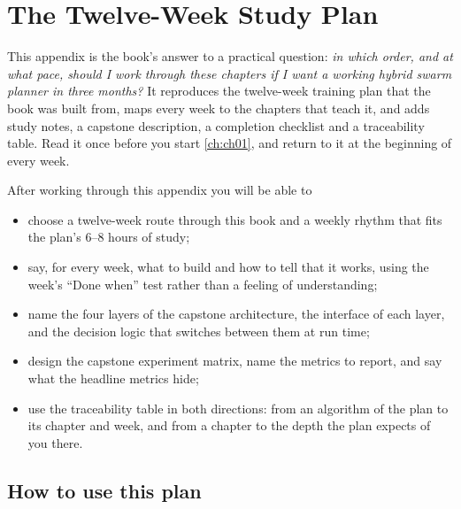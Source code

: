 \chapter{The Twelve-Week Study Plan}
\label{ch:appA}

This appendix is the book's answer to a practical question: \emph{in which order, and at
what pace, should I work through these chapters if I want a working hybrid swarm planner in
three months?} It reproduces the twelve-week training plan that the book was built from,
maps every week to the chapters that teach it, and adds study notes, a capstone
description, a completion checklist and a traceability table. Read it once before you start
\cref{ch:ch01}, and return to it at the beginning of every week.

\begin{objectives}
After working through this appendix you will be able to
\begin{itemize}
  \item choose a twelve-week route through this book and a weekly rhythm that fits the
    plan's 6--8 hours of study;
  \item say, for every week, what to build and how to tell that it works, using the week's
    ``Done when'' test rather than a feeling of understanding;
  \item name the four layers of the capstone architecture, the interface of each layer, and
    the decision logic that switches between them at run time;
  \item design the capstone experiment matrix, name the metrics to report, and say what the
    headline metrics hide;
  \item use the traceability table in both directions: from an algorithm of the plan to its
    chapter and week, and from a chapter to the depth the plan expects of you there.
\end{itemize}
\end{objectives}

\section{How to use this plan}
\label{sec:appA-intro}

